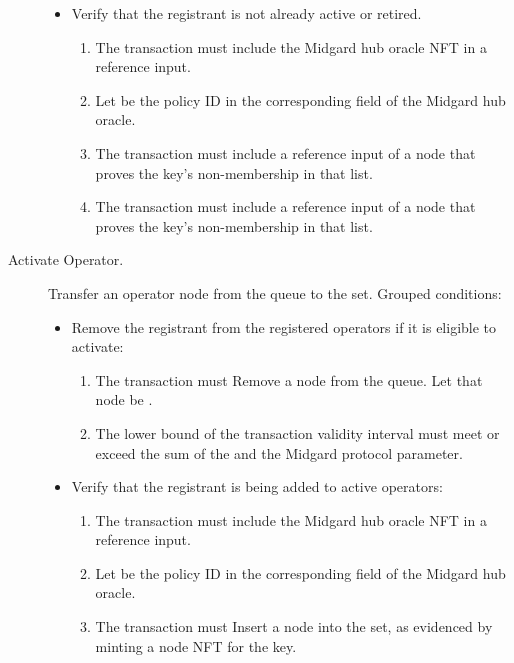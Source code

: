 \documentclass[../midgard.tex]{subfiles}
\begin{document}
\begin{description}
\begin{itemize}
            \item Verify that the registrant is not already active or retired.
            \begin{enumerate}[resume]
                \item The transaction must include the Midgard hub oracle NFT in a reference input.
                \item Let  be the policy ID in the corresponding field of the Midgard hub oracle.
                \item The transaction must include a reference input of a  node that proves the  key's non-membership in that list.
                \item The transaction must include a reference input of a  node that proves the  key's non-membership in that list.
            \end{enumerate}
        \end{itemize}
    \item[Activate Operator.] Transfer an operator node from the  queue to the  set. Grouped conditions:
        \begin{itemize}
            \item Remove the registrant from the registered operators if it is eligible to activate:
            \begin{enumerate}
                \item The transaction must Remove a node from the  queue. Let that node be .
                \item The lower bound of the transaction validity interval must meet or exceed the sum of the  and the Midgard  protocol parameter.
            \end{enumerate}
            \item Verify that the registrant is being added to active operators:
            \begin{enumerate}[resume]
                \item The transaction must include the Midgard hub oracle NFT in a reference input.
                \item Let  be the policy ID in the corresponding field of the Midgard hub oracle.
                \item The transaction must Insert a node into the  set, as evidenced by minting a  node NFT for the  key.

\end{enumerate}
\end{itemize}
\end{description}
\end{document}
